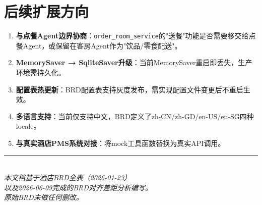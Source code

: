 \documentclass[12pt,a4paper]{ctexart}
\begin{document}
\newpage

\section{后续扩展方向}

\begin{enumerate}
    \item \textbf{与点餐Agent边界协商}：\texttt{order\_room\_service}的"送餐"功能是否需要移交给点餐Agent，或保留在客房Agent作为"饮品/零食配送"。
    \item \textbf{MemorySaver → SqliteSaver升级}：当前MemorySaver重启即丢失，生产环境需持久化。
    \item \textbf{配置表热更新}：BRD配置表支持灰度发布，需实现配置文件变更后不重启生效。
    \item \textbf{多语言支持}：当前仅支持中文，BRD定义了zh-CN/zh-GD/en-US/en-SG四种locale。
    \item \textbf{与真实酒店PMS系统对接}：将mock工具函数替换为真实API调用。
\end{enumerate}

\vspace{1cm}
\begin{center}
\rule{0.5\textwidth}{0.5pt}\\[4pt]
\textit{本文档基于酒店BRD全表（2026-01-23）\\ 以及2026-06-09完成的BRD对齐差距分析编写。\\ 原始BRD未做任何删改。}
\end{center}
\end{document}
